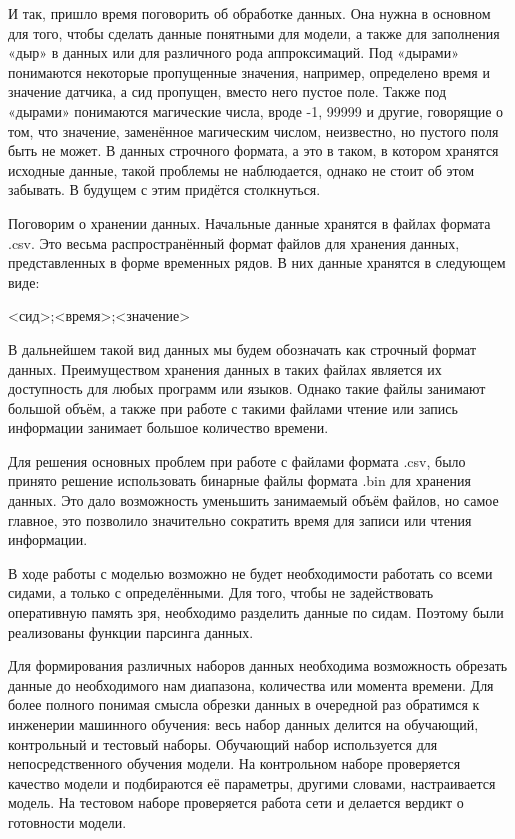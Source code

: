 {\gostFont

  \par \redline И так, пришло время поговорить об обработке данных. Она нужна в основном для того, чтобы сделать данные понятными для модели, а также для заполнения «дыр» в данных или для различного рода аппроксимаций. Под «дырами» понимаются некоторые пропущенные значения, например, определено время и значение датчика, а сид пропущен, вместо него пустое поле. Также под «дырами» понимаются магические числа, вроде -1, 99999 и другие, говорящие о том, что значение, заменённое магическим числом, неизвестно, но пустого поля быть не может. В данных строчного формата, а это в таком, в котором хранятся исходные данные, такой проблемы не наблюдается, однако не стоит об этом забывать. В будущем с этим придётся столкнуться.

  \par \redline Поговорим о хранении данных. Начальные данные хранятся в файлах формата .csv. Это весьма распространённый формат файлов для хранения данных, представленных в форме временных рядов. В них данные хранятся в следующем виде: 

  \formulaspace
  \begin{Center}
  <сид>;<время>;<значение>
  \end{Center}
  \formulaspace

  \par \redline В дальнейшем такой вид данных мы будем обозначать как строчный формат данных. Преимуществом хранения данных в таких файлах является их доступность для любых программ или языков. Однако такие файлы занимают большой объём, а также при работе с такими файлами чтение или запись информации занимает большое количество времени.  

  \par \redline Для решения основных проблем при работе с файлами формата .csv, было принято решение использовать бинарные файлы формата .bin для хранения данных. Это дало возможность уменьшить занимаемый объём файлов, но самое главное, это позволило значительно сократить время для записи или чтения информации. 

  \par \redline В ходе работы с моделью возможно не будет необходимости работать со всеми сидами, а только с определёнными. Для того, чтобы не задействовать оперативную память зря, необходимо разделить данные по сидам. Поэтому были реализованы функции парсинга данных.

  \par \redline Для формирования различных наборов данных необходима возможность обрезать данные до необходимого нам диапазона, количества или момента времени. Для более полного понимая смысла обрезки данных в очередной раз обратимся к инженерии машинного обучения: весь набор данных делится на обучающий, контрольный и тестовый наборы. Обучающий набор используется для непосредственного обучения модели. На контрольном наборе проверяется качество модели и подбираются её параметры, другими словами, настраивается модель. На тестовом наборе проверяется работа сети и делается вердикт о готовности модели. 

}
